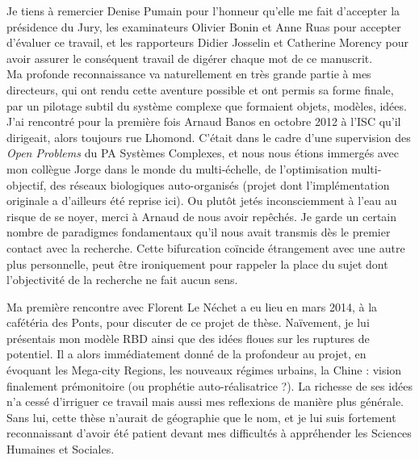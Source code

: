 
Je tiens à remercier Denise Pumain pour l'honneur qu'elle me fait d'accepter la présidence du Jury, les examinateurs Olivier Bonin et Anne Ruas pour accepter d'évaluer ce travail, et les rapporteurs Didier Josselin et Catherine Morency pour avoir assurer le conséquent travail de digérer chaque mot de ce manuscrit.\\








Ma profonde reconnaissance va naturellement en très grande partie à mes directeurs, qui ont rendu cette aventure possible et ont permis sa forme finale, par un pilotage subtil du système complexe que formaient objets, modèles, idées. J'ai rencontré pour la première fois Arnaud Banos en octobre 2012 à l'ISC qu'il dirigeait, alors toujours rue Lhomond. C'était dans le cadre d'une supervision des \emph{Open Problems} du PA Systèmes Complexes, et nous nous étions immergés avec mon collègue Jorge dans le monde du multi-échelle, de l'optimisation multi-objectif, des réseaux biologiques auto-organisés (projet dont l'implémentation originale a d'ailleurs été reprise ici). Ou plutôt jetés inconsciemment à l'eau au risque de se noyer, merci à Arnaud de nous avoir repêchés. Je garde un certain nombre de paradigmes fondamentaux qu'il nous avait transmis dès le premier contact avec la recherche. Cette bifurcation coïncide étrangement avec une autre plus personnelle, peut être ironiquement pour rappeler la place du sujet dont l'objectivité de la recherche ne fait aucun sens.

Ma première rencontre avec Florent Le Néchet a eu lieu en mars 2014, à la cafétéria des Ponts, pour discuter de ce projet de thèse. Naïvement, je lui présentais mon modèle RBD ainsi que des idées floues sur les ruptures de potentiel. Il a alors immédiatement donné de la profondeur au projet, en évoquant les Mega-city Regions, les nouveaux régimes urbains, la Chine : vision finalement prémonitoire (ou prophétie auto-réalisatrice ?). La richesse de ses idées n'a cessé d'irriguer ce travail mais aussi mes reflexions de manière plus générale. Sans lui, cette thèse n'aurait de géographie que le nom, et je lui suis fortement reconnaissant d'avoir été patient devant mes difficultés à appréhender les Sciences Humaines et Sociales.\\



